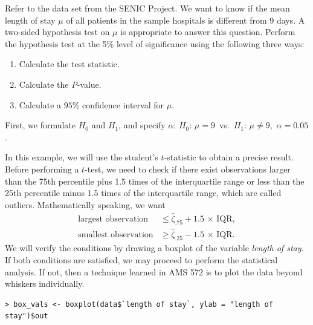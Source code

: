 \documentclass[11pt]{article}
\begin{document}
\begin{question}
Refer to the data set from the SENIC Project. We want to know if the mean length of stay $\mu$ of all patients in the sample hospitals is different from 9 days. A two-sided hypothesis test on $\mu$ is appropriate to answer this question. Perform the hypothesis test at the 5\% level of significance using the following three ways:
\begin{enumerate}[(1)]
		\item Calculate the test statistic.
		\item Calculate the \textit{P}-value.
		\item Calculate a $95\%$ confidence interval for $\mu$.
\end{enumerate}
\end{question}\label{ques_1}

First, we formulate $\textit{H}_0$ and $\textit{H}_1$, and specify $\alpha$: $\textit{H}_0$: $\mu = 9$\, vs.\, $\textit{H}_1$: $\mu \neq 9$,\, $\alpha = 0.05$.

In this example, we will use the student's $t$-statistic to obtain a precise result. Before performing a $t$-test, we need to check if there exist observations larger than the 75th percentile plus 1.5 times of the interquartile range or less than the 25th percentile minus 1.5 times of the interquartile range, which are called outliers. Mathematically speaking, we want
\begin{align*}
\textrm{largest observation}&\leq \hat{\zeta}_{.75}+1.5\,\times\,\textrm{IQR},\\
\textrm{smallest observation}&\geq \hat{\zeta}_{.25}-1.5\,\times\,\textrm{IQR}.
\end{align*}
We will verify the conditions by drawing a boxplot of the variable \textit{length of stay}. If both conditions are satisfied, we may proceed to perform the statistical analysis. If not, then a technique learned in AMS 572 is to plot the data beyond whiskers individually.
\begin{commandline}
\begin{verbatim}
> box_vals <- boxplot(data$`length of stay`, ylab = "length of stay")$out
\end{verbatim}
\end{commandline}
\end{document}
